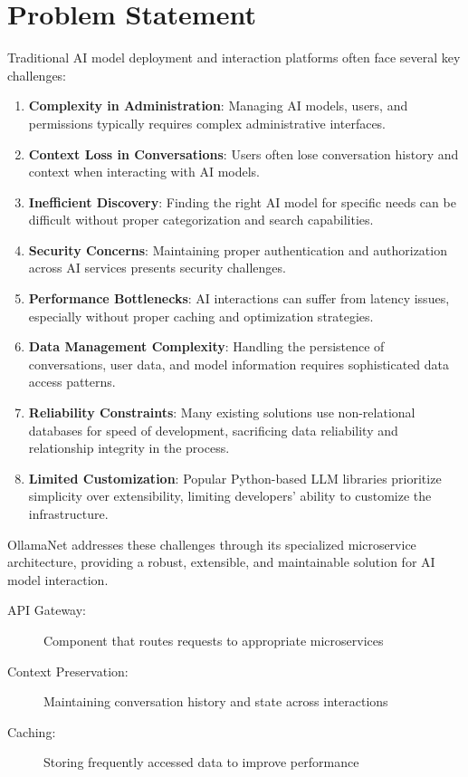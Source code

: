 \section{Problem Statement}

Traditional AI model deployment and interaction platforms often face several key challenges:

\begin{enumerate}
    \item \textbf{Complexity in Administration}: Managing AI models, users, and permissions typically requires complex administrative interfaces.
    \item \textbf{Context Loss in Conversations}: Users often lose conversation history and context when interacting with AI models.
    \item \textbf{Inefficient Discovery}: Finding the right AI model for specific needs can be difficult without proper categorization and search capabilities.
    \item \textbf{Security Concerns}: Maintaining proper authentication and authorization across AI services presents security challenges.
    \item \textbf{Performance Bottlenecks}: AI interactions can suffer from latency issues, especially without proper caching and optimization strategies.
    \item \textbf{Data Management Complexity}: Handling the persistence of conversations, user data, and model information requires sophisticated data access patterns.
    \item \textbf{Reliability Constraints}: Many existing solutions use non-relational databases for speed of development, sacrificing data reliability and relationship integrity in the process.
    \item \textbf{Limited Customization}: Popular Python-based LLM libraries prioritize simplicity over extensibility, limiting developers' ability to customize the infrastructure.
\end{enumerate}

OllamaNet addresses these challenges through its specialized microservice architecture, providing a robust, extensible, and maintainable solution for AI model interaction.

\begin{terminology}
\begin{description}
    \item[API Gateway:] Component that routes requests to appropriate microservices
    \item[Context Preservation:] Maintaining conversation history and state across interactions
    \item[Caching:] Storing frequently accessed data to improve performance
\end{description}
\end{terminology}

